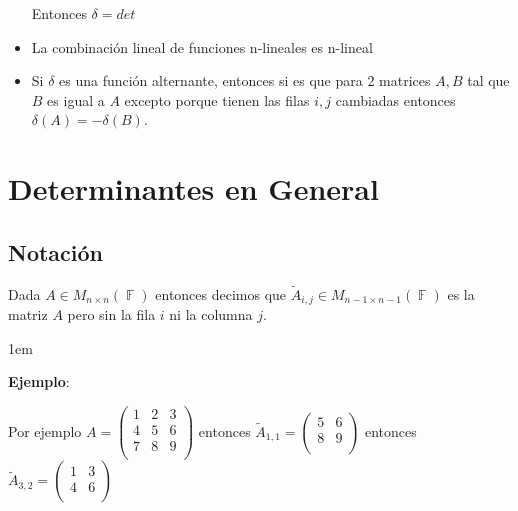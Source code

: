 \documentclass[12pt, fleqn]{report}                             %
\newenvironment{SmallIndentation}[1][0.75em]                    %
        {\begin{adjustwidth}{#1}{}\begin{footnotesize}}             %
        {\end{footnotesize}\end{adjustwidth}}                       %
\theoremstyle{break}                                            %
\DeclareMathOperator \GenericField {\mathbb{F}}                 %
\newcommand{\pVector}[1]                                        %
        { \ensuremath{\begin{pmatrix}#1\end{pmatrix}} }             %
\begin{document}
\begin{itemize}
                    Entonces $\delta = det$

                \item
                    La combinación lineal de funciones n-lineales es n-lineal

                \item
                    Si $\delta$ es una función alternante, entonces si es que
                    para 2 matrices $A, B$ tal que $B$ es igual a $A$ excepto
                    porque tienen las filas $i, j$ cambiadas entonces
                    $\delta(A) = - \delta(B)$.

            \end{itemize}







    \chapter{Determinantes en General}

        \clearpage
        \section{Notación}

            Dada $A \in M_{n \times n}(\GenericField)$ entonces decimos que
            $\tilde A_{i, j} \in M_{n-1 \times n-1}(\GenericField)$ es la matriz $A$
            pero sin la fila $i$ ni la columna $j$.

            \begin{SmallIndentation}[1em]
                \textbf{Ejemplo}:
                
                Por ejemplo $A = \pVector{
                    1 & 2 & 3   \\
                    4 & 5 & 6   \\
                    7 & 8 & 9   \\
                }$ entonces $\tilde A_{1, 1} = \pVector{
                    5 & 6   \\
                    8 & 9   \\
                }$ entonces $\tilde A_{3, 2} = \pVector{
                    1 & 3   \\
                    4 & 6   \\
                }$ 
            
            \end{SmallIndentation}
                
\end{document}
